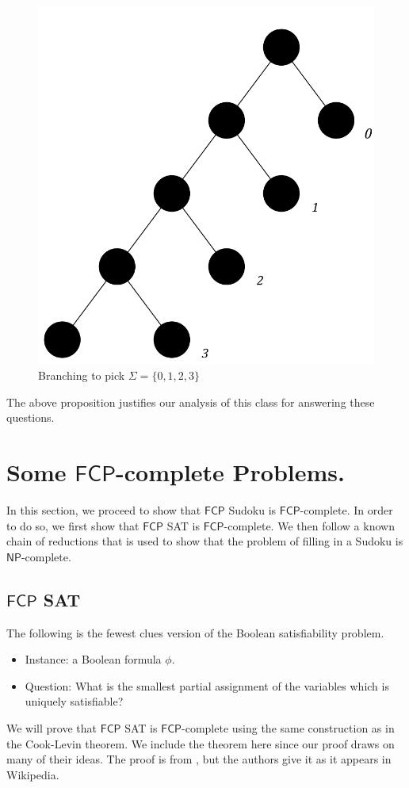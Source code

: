 \documentclass[runningheads,a4paper]{llncs}
\begin{document}
\begin{figure}
\centering
\label{fig:branching}
\includegraphics[width=0.4\linewidth]{branching.pdf}
\caption{Branching to pick $\Sigma = \{ 0, 1, 2, 3 \}$}
\end{figure}

The above proposition justifies our analysis of this class for answering these questions.

\section{Some $\mathsf{FCP}$-complete Problems.}
\label{sec:The Problems}

In this section, we proceed to show that $\mathsf{FCP}$ Sudoku is $\mathsf{FCP}$-complete. In order to do so, we first show that $\mathsf{FCP}$ SAT is $\mathsf{FCP}$-complete. We then follow a known chain of reductions that is used to show that the problem of filling in a Sudoku is $\mathsf{NP}$-complete. 

\subsection{$\mathsf{FCP}$ SAT}
The following is the fewest clues version of the Boolean satisfiability problem.

\begin{itemize}
\item Instance: a Boolean formula $\phi$.
\item Question: What is the smallest partial assignment of the variables which is uniquely satisfiable?
\end{itemize}

We will prove that $\mathsf{FCP}$ SAT is $\mathsf{FCP}$-complete using the same construction as in the Cook-Levin theorem. We include the theorem here since our proof draws on many of their ideas. The proof is from \cite{Garey}, but the authors give it as it appears in Wikipedia.
\end{document}
